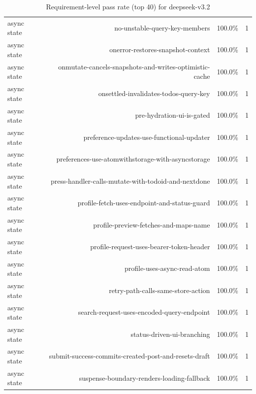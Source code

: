 \begin{table}[htbp]
\begin{tabular}{lrrr}
async state & no-unstable-query-key-members & 100.0\% & 1 \\
async state & onerror-restores-snapshot-context & 100.0\% & 1 \\
async state & onmutate-cancels-snapshots-and-writes-optimistic-cache & 100.0\% & 1 \\
async state & onsettled-invalidates-todos-query-key & 100.0\% & 1 \\
async state & pre-hydration-ui-is-gated & 100.0\% & 1 \\
async state & preference-updates-use-functional-updater & 100.0\% & 1 \\
async state & preferences-use-atomwithstorage-with-asyncstorage & 100.0\% & 1 \\
async state & press-handler-calls-mutate-with-todoid-and-nextdone & 100.0\% & 1 \\
async state & profile-fetch-uses-endpoint-and-status-guard & 100.0\% & 1 \\
async state & profile-preview-fetches-and-maps-name & 100.0\% & 1 \\
async state & profile-request-uses-bearer-token-header & 100.0\% & 1 \\
async state & profile-uses-async-read-atom & 100.0\% & 1 \\
async state & retry-path-calls-same-store-action & 100.0\% & 1 \\
async state & search-request-uses-encoded-query-endpoint & 100.0\% & 1 \\
async state & status-driven-ui-branching & 100.0\% & 1 \\
async state & submit-success-commits-created-post-and-resets-draft & 100.0\% & 1 \\
async state & suspense-boundary-renders-loading-fallback & 100.0\% & 1 \\
\bottomrule
\end{tabular}
\caption{Requirement-level pass rate (top 40) for deepseek-v3.2}
\end{table}
